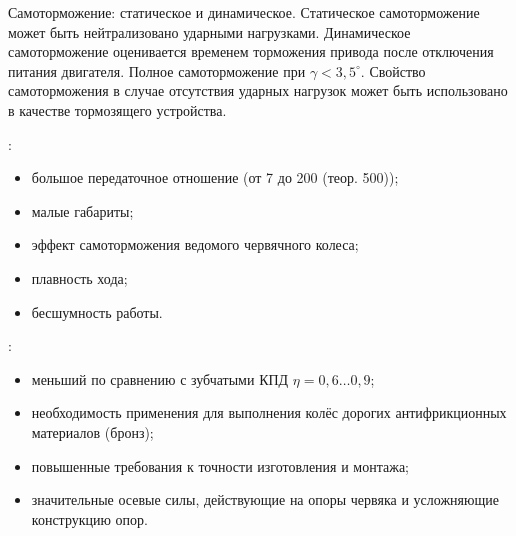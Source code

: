 Самоторможение: статическое и динамическое. Статическое самоторможение может быть нейтрализовано ударными нагрузками. Динамическое самоторможение оценивается временем торможения привода после отключения питания двигателя. Полное самоторможение при $ \gamma < 3,5^\circ $. Свойство самоторможения в случае отсутствия ударных нагрузок может быть использовано в качестве тормозящего устройства.

:
\begin{itemize}
	\item большое передаточное отношение (от 7 до 200 (теор. 500));
	\item малые габариты;
	\item эффект самоторможения ведомого червячного колеса;
	\item плавность хода;
	\item бесшумность работы.
\end{itemize}

:
\begin{itemize}
	\item меньший по сравнению с зубчатыми КПД $ \eta=0,6\ldots0,9 $;
	\item необходимость применения для выполнения колёс дорогих антифрикционных материалов (бронз);
	\item повышенные требования к точности изготовления и монтажа;
	\item значительные осевые силы, действующие на опоры червяка и усложняющие конструкцию опор.
\end{itemize}